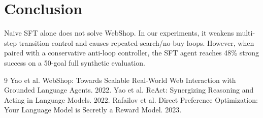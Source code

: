 \documentclass[11pt]{article}
\begin{document}
\section{Conclusion}
Naive SFT alone does not solve WebShop. In our experiments, it weakens multi-step transition control and causes repeated-search/no-buy loops. However, when paired with a conservative anti-loop controller, the SFT agent reaches 48\% strong success on a 50-goal full synthetic evaluation.

\begin{thebibliography}{9}
Yao et al. WebShop: Towards Scalable Real-World Web Interaction with Grounded Language Agents. 2022.
Yao et al. ReAct: Synergizing Reasoning and Acting in Language Models. 2022.
Rafailov et al. Direct Preference Optimization: Your Language Model is Secretly a Reward Model. 2023.
\end{thebibliography}
\end{document}
